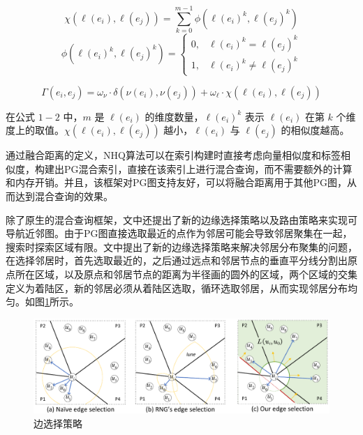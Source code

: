 \documentclass[12pt,UTF8,AutoFakeBold=2,a4paper]{ctexart} %
\begin{document}
\begin{equation}
\chi\left(\ell\left(e_i\right), \ell\left(e_j\right)\right)=\sum_{k=0}^{m-1} \phi\left(\ell\left(e_i\right)^k, \ell\left(e_j\right)^k\right)
    \label{eq:lable_dist}
\end{equation}
\begin{equation}
\phi\left(\ell\left(e_i\right)^k, \ell\left(e_j\right)^k\right)= \begin{cases}0, & \ell\left(e_i\right)^k=\ell\left(e_j\right)^k \\ 1, & \ell\left(e_i\right)^k \neq \ell\left(e_j\right)^k\end{cases}
    \label{eq:lable_dist2}
\end{equation}

\begin{equation}
\Gamma\left(e_i, e_j\right)=\omega_\nu \cdot \delta\left(\nu\left(e_i\right), \nu\left(e_j\right)\right)+\omega_{\ell} \cdot \chi\left(\ell\left(e_i\right), \ell\left(e_j\right)\right)
\label{eq:merged_distance}
\end{equation}

在公式 $1-2$ 中，$m$ 是 $\ell\left(e_i\right)$ 的维度数量，$\ell\left(e_i\right)^k$ 表示 $\ell\left(e_i\right)$ 在第 $k$ 个维度上的取值。$\chi\left(\ell\left(e_i\right), \ell\left(e_j\right)\right)$ 越小，$\ell\left(e_i\right)$ 与 $\ell\left(e_j\right)$ 的相似度越高。

通过融合距离的定义，NHQ算法可以在索引构建时直接考虑向量相似度和标签相似度，构建出PG混合索引，直接在该索引上进行混合查询，而不需要额外的计算和内存开销。并且，该框架对PG图支持友好，可以将融合距离用于其他PG图，从而达到混合查询的效果。

除了原生的混合查询框架，文中还提出了新的边缘选择策略以及路由策略来实现可导航近邻图。由于PG图直接选取最近的点作为邻居可能会导致邻居聚集在一起，搜索时探索区域有限。文中提出了新的边缘选择策略来解决邻居分布聚集的问题，在选择邻居时，首先选取最近的，之后通过远点和邻居节点的垂直平分线分割出原点所在区域，以及原点和邻居节点的距离为半径画的圆外的区域，两个区域的交集定义为着陆区，新的邻居必须从着陆区选取，循环选取邻居，从而实现邻居分布均匀。如图\ref{fig:edge}所示。
\begin{figure}[h] %
    \centering %
    \includegraphics[width=1\textwidth]{edge_selection.pdf} %
    \caption{边选择策略}
    \label{fig:edge} %
\end{figure}
\end{document}
